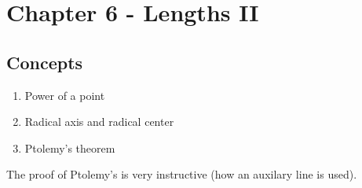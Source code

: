 \documentclass[11pt,twoside]{scrartcl}
\begin{document}
\clearpage
\section{Chapter 6 - Lengths II}
\subsection{Concepts}
\begin{enumerate}
    \item Power of a point
    \item Radical axis and radical center
    \item Ptolemy's theorem
\end{enumerate}

\begin{remark}
    The proof of Ptolemy's is very instructive (how an auxilary line is used).
\end{remark}
\end{document}
